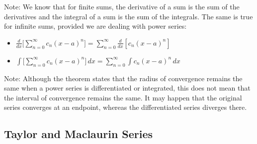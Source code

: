 Note: We know that for finite sums, the derivative of a sum is the sum of the derivatives and the integral of a sum is the sum of the integrals. The same is true for infinite sums, provided we are dealing with power series:

\begin{itemize}
    \item $\frac{d}{dx} \Big[ \sum_{n=0}^\infty c_n (x - a)^n \Big] = \sum_{n=0}^\infty \frac{d}{dx} [c_n (x - a)^n]$

    \item $\int \Big[ \sum_{n=0}^\infty c_n (x - a)^n \Big] \, dx = \sum_{n=0}^\infty \int c_n (x - a)^n \, dx$
\end{itemize}

Note: Although the theorem states that the radius of convergence remains the same when a power series is differentiated or integrated, this does not mean that the interval of convergence remains the same. It may happen that the original series converges at an endpoint, whereas the differentiated series diverges there.

\subsection{Taylor and Maclaurin Series}

